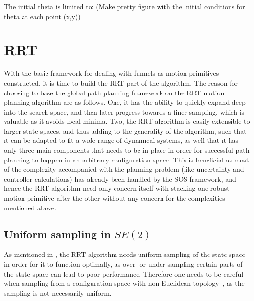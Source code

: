 The initial theta is limited to: (Make pretty figure with the initial conditions
for theta at each point (x,y))

\section{RRT}
\label{sec:RRT}

With the basic framework for dealing with funnels as motion primitives
constructed, it is time to build the \ac{RRT} part of the \rrtfunnel{}
algorithm. The reason for choosing to base the global path planning framework on
the \ac{RRT} motion planning algorithm are as follows. One, it has the ability
to quickly expand deep into the search-space, and then later progress towards a
finer sampling, which is valuable as it avoids local minima. Two, the \ac{RRT}
algorithm is easily extensible to larger state spaces, and thus adding to the
generality of the \rrtfunnel{} algorithm, such that it can be adapted to fit a
wide range of dynamical systems, as well that it has only three main components
that needs to be in place in order for successful path planning to happen in an
arbitrary configuration space. This is beneficial as most of the complexity
accompanied with the planning problem (like uncertainty and controller
calculations) has already been handled by the \ac{SOS} framework, and hence the
\ac{RRT} algorithm need only concern itself with stacking one robust motion
primitive after the other without any concern for the complexities mentioned
above.

\subsection{Uniform sampling in \(SE(2)\)}

As mentioned in , the \ac{RRT} algorithm needs
uniform sampling of the state space in order for it to function optimally, as
over- or under-sampling certain parts of the state space can lead to poor
performance. Therefore one needs to be careful when sampling from a
configuration space with non Euclidean
topology~\cite{kuffnerEffectiveSamplingDistance2004}, as the sampling is not
necessarily uniform.

